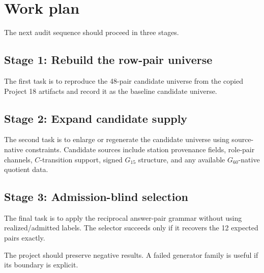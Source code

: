 \section{Work plan}

The next audit sequence should proceed in three stages.

\subsection{Stage 1: Rebuild the row-pair universe}

The first task is to reproduce the 48-pair candidate universe from the copied Project 18 artifacts and record it as the baseline candidate universe.

\subsection{Stage 2: Expand candidate supply}

The second task is to enlarge or regenerate the candidate universe using source-native constraints. Candidate sources include station provenance fields, role-pair channels, \(C\)-transition support, signed \(G_{15}\) structure, and any available \(G_{60}\)-native quotient data.

\subsection{Stage 3: Admission-blind selection}

The final task is to apply the reciprocal answer-pair grammar without using realized/admitted labels. The selector succeeds only if it recovers the 12 expected pairs exactly.

The project should preserve negative results. A failed generator family is useful if its boundary is explicit.
